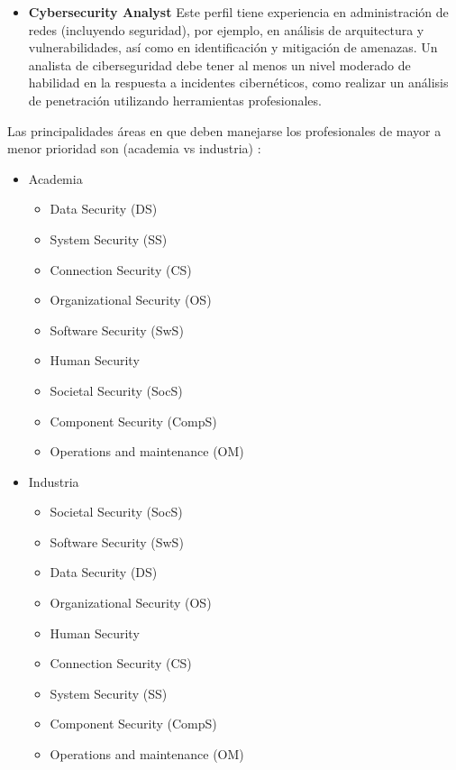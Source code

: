 \begin{itemize}
\item \textbf{Cybersecurity Analyst}	Este perfil tiene experiencia en administración de redes (incluyendo seguridad), por ejemplo, en análisis de arquitectura y vulnerabilidades, así como en identificación y mitigación de amenazas. Un analista de ciberseguridad debe tener al menos un nivel moderado de habilidad en la respuesta a incidentes cibernéticos, como realizar un análisis de penetración utilizando herramientas profesionales.	

\end{itemize}

Las principalidades áreas en que deben manejarse los profesionales de mayor a menor prioridad son (academia vs industria) :	\begin{itemize}
    \item Academia 
        \begin{itemize}
            \item Data Security (DS)
            \item System Security (SS)
            \item Connection Security (CS)
            \item Organizational Security (OS)
            \item Software Security (SwS)
            \item Human Security
            \item Societal Security (SocS)
            \item Component Security (CompS)
            \item Operations and maintenance  (OM)
        \end{itemize}
    \item Industria
     \begin{itemize}
            \item Societal Security (SocS)
            \item Software Security (SwS)
            \item Data Security (DS)
            \item Organizational Security (OS)
             \item Human Security
            
            \item Connection Security (CS)
            \item System Security (SS)
            \item Component Security (CompS)
            \item Operations and maintenance (OM)
        \end{itemize}
\end{itemize}	
